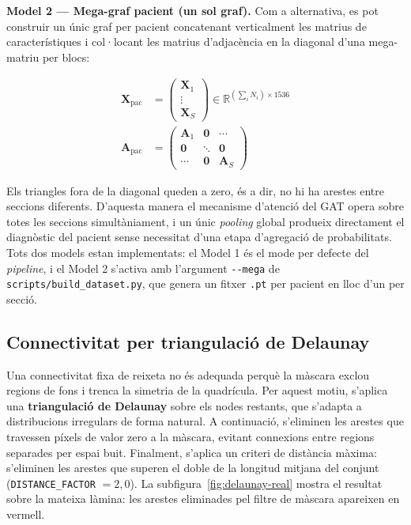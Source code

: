 \documentclass[10pt,a4paper,twocolumn,twoside]{article}
\begin{document}
\textbf{Model 2 --- Mega-graf pacient (un sol graf).}
Com a alternativa, es pot construir un únic graf per pacient concatenant verticalment les matrius de
característiques i col·locant les matrius d'adjacència en la diagonal d'una mega-matriu per blocs:

\begin{align}
  \mathbf{X}_{\text{pac}} &=
  \begin{pmatrix}
    \mathbf{X}_1 \\
    \vdots \\
    \mathbf{X}_S
  \end{pmatrix}
  \in \mathbb{R}^{\left(\sum_i N_i\right) \times 1536} \\[10pt]
  \mathbf{A}_{\text{pac}} &=
  \begin{pmatrix}
    \mathbf{A}_1 & \mathbf{0} & \cdots \\
    \mathbf{0}   & \ddots     & \mathbf{0} \\
    \cdots       & \mathbf{0} & \mathbf{A}_S
  \end{pmatrix}
\end{align}

Els triangles fora de la diagonal queden a zero, és a dir, no hi ha arestes entre seccions
diferents. D'aquesta manera el mecanisme d'atenció del GAT opera sobre totes les seccions
simultàniament, i un únic \textit{pooling} global produeix directament el diagnòstic del pacient
sense necessitat d'una etapa d'agregació de probabilitats. Tots dos models estan implementats:
el Model 1 és el mode per defecte del \textit{pipeline}, i el Model 2 s'activa amb l'argument
\texttt{-{}-mega} de \texttt{scripts/build\_dataset.py}, que genera un fitxer \texttt{.pt} per
pacient en lloc d'un per secció.

\subsection{Connectivitat per triangulació de Delaunay}

Una connectivitat fixa de reixeta no és adequada perquè la màscara exclou regions de fons i trenca la
simetria de la quadrícula. Per aquest motiu, s'aplica una \textbf{triangulació de Delaunay} sobre els
nodes restants, que s'adapta a distribucions irregulars de forma natural. A continuació, s'eliminen les
arestes que travessen píxels de valor zero a la màscara, evitant connexions entre regions separades per
espai buit. Finalment, s'aplica un criteri de distància màxima: s'eliminen les arestes que superen el
doble de la longitud mitjana del conjunt (\texttt{DISTANCE\_FACTOR} $= 2{,}0$). La subfigura~\ref{fig:delaunay-real} mostra el resultat sobre
la mateixa làmina: les arestes eliminades pel filtre de màscara apareixen en vermell.
\end{document}
